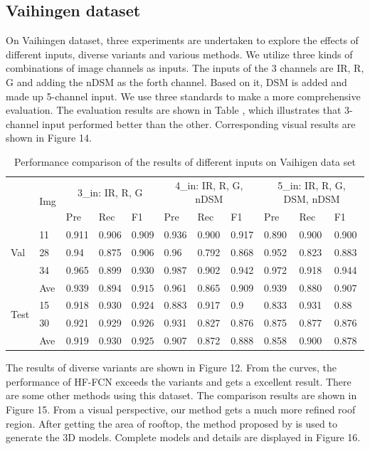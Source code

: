 \subsection{Vaihingen dataset}
On Vaihingen dataset, three experiments are undertaken to explore the effects of different inputs, diverse variants and various methods. We utilize  three kinds of combinations of image channels as inputs. The inputs of the 3 channels are IR, R, G and adding the nDSM as the forth channel. Based on it, DSM is added and made up 5-channel input. We use three standards to make a more comprehensive evaluation. The evaluation results are shown in Table , which illustrates that 3-channel input performed better than the other. Corresponding visual results are shown in Figure 14.\par
\begin{table}[htbp]
\caption {Performance comparison of the results of different inputs on Vaihigen data set}
\centering
\begin{tabular}{p{1.1cm}<{\centering}|p{1.1cm}<{\centering}|p{1.1cm}<{\centering}|p{1.1cm}<{\centering}|p{1.1cm}<{\centering}|p{1.1cm}<{\centering}|p{1.1cm}<{\centering}|p{1.1cm}<{\centering}|p{1.1cm}<{\centering}|p{1.1cm}<{\centering}|p{1.1cm}<{\centering}}
\hline
&\multirow{2}{*}{Img}&\multicolumn{3}{c}{3\_in: IR, R, G} &\multicolumn{3}{|c|}{4\_in: IR, R, G, nDSM}&\multicolumn{3}{c}{5\_in: IR, R, G, DSM, nDSM}\\
\cline{3-11}
&& Pre &Rec & F1 &Pre &Rec &F1&Pre &Rec &F1\\
\hline
\multirow{3}{*}{Val}&11&0.911&0.906&0.909&0.936&0.900&0.917&0.890&0.900&0.900\\
&28&0.94&0.875&0.906&0.96&0.792&0.868&0.952&0.823&0.883\\
&34&0.965&0.899&0.930&0.987&0.902&0.942&0.972&0.918&0.944\\
&Ave&0.939&0.894&$\bm{0.915}$&0.961&0.865&0.909&0.939&0.880&0.907\\
\hline
\multirow{2}{*}{Test}&15&0.918&0.930&0.924&0.883&0.917&0.9&0.833&0.931&0.88\\
&30&0.921&0.929&0.926&0.931&0.827&0.876&0.875&0.877&0.876\\
&Ave&0.919&0.930&$\bm{0.925}$&0.907&0.872&0.888&0.858&0.900&0.878\\
\hline
\end{tabular}
\end{table}

\setlength{\parindent}{2ex}The results of diverse variants are shown in Figure 12. From the curves, the performance of HF-FCN exceeds the variants and gets a excellent result. There are some other methods using this dataset. The comparison results are shown in Figure 15. From a visual perspective, our method gets a much more refined roof region. After getting the area of rooftop, the method proposed by \cite{IEEEexample:zhou20112} is used to generate the 3D models. Complete models and details are displayed in Figure 16.

